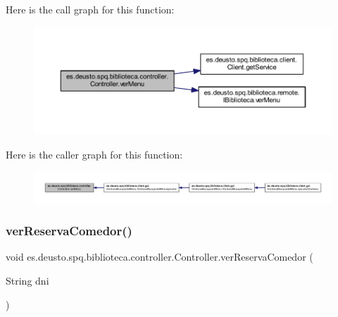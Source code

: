 Here is the call graph for this function\+:
\nopagebreak
\begin{figure}[H]
\begin{center}
\leavevmode
\includegraphics[width=350pt]{classes_1_1deusto_1_1spq_1_1biblioteca_1_1controller_1_1_controller_a33b36798ff65a516ecf45f872cb09235_cgraph}
\end{center}
\end{figure}
Here is the caller graph for this function\+:
\nopagebreak
\begin{figure}[H]
\begin{center}
\leavevmode
\includegraphics[width=350pt]{classes_1_1deusto_1_1spq_1_1biblioteca_1_1controller_1_1_controller_a33b36798ff65a516ecf45f872cb09235_icgraph}
\end{center}
\end{figure}
\mbox{\label{classes_1_1deusto_1_1spq_1_1biblioteca_1_1controller_1_1_controller_a75d13ac6d80a603e7d8c5482409580d7}} 
\subsubsection{\texorpdfstring{ver\+Reserva\+Comedor()}{verReservaComedor()}}
{\footnotesize\ttfamily void es.\+deusto.\+spq.\+biblioteca.\+controller.\+Controller.\+ver\+Reserva\+Comedor (\begin{DoxyParamCaption}\item[{String}]{dni }\end{DoxyParamCaption})}

